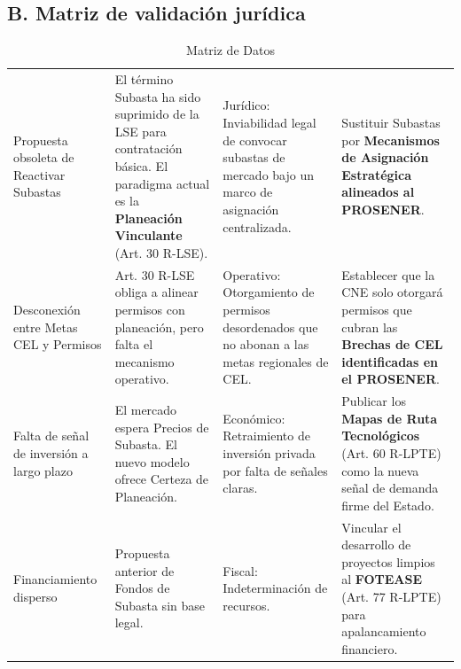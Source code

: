 \documentclass{cel}
\begin{document}
\subsection{B. Matriz de validación jurídica}
\nopagebreak

\vspace{0.3cm}
\begin{tabladoradoLargo}
\renewcommand{\tabularxcolumn}[1]{p{#1}}
\begin{xltabular}{\textwidth}{|X|X|X|X|}
\caption{Matriz de Datos} \\
\toprule
{}  &  &  &  \\
\midrule
\endhead
Propuesta obsoleta de \textquotedbl{}Reactivar Subastas\textquotedbl{} & El término \textquotedbl{}Subasta\textquotedbl{} ha sido suprimido de la LSE para contratación básica. El paradigma actual es la \textbf{Planeación Vinculante} (Art. 30 R-LSE). & Jurídico: Inviabilidad legal de convocar subastas de mercado bajo un marco de asignación centralizada. & Sustituir \textquotedbl{}Subastas\textquotedbl{} por \textbf{\textquotedbl{}Mecanismos de Asignación Estratégica alineados al PROSENER\textquotedbl{}}. \\ \hline
Desconexión entre Metas CEL y Permisos & Art. 30 R-LSE obliga a alinear permisos con planeación, pero falta el mecanismo operativo. & Operativo: Otorgamiento de permisos desordenados que no abonan a las metas regionales de CEL. & Establecer que la CNE solo otorgará permisos que cubran las \textbf{Brechas de CEL identificadas en el PROSENER}. \\ \hline
Falta de señal de inversión a largo plazo & El mercado espera \textquotedbl{}Precios de Subasta\textquotedbl{}. El nuevo modelo ofrece \textquotedbl{}Certeza de Planeación\textquotedbl{}. & Económico: Retraimiento de inversión privada por falta de señales claras. & Publicar los \textbf{Mapas de Ruta Tecnológicos} (Art. 60 R-LPTE) como la nueva señal de demanda firme del Estado. \\ \hline
Financiamiento disperso & Propuesta anterior de \textquotedbl{}Fondos de Subasta\textquotedbl{} sin base legal. & Fiscal: Indeterminación de recursos. & Vincular el desarrollo de proyectos limpios al \textbf{FOTEASE} (Art. 77 R-LPTE) para apalancamiento financiero. \\ \hline
\bottomrule
\end{xltabular}
\end{tabladoradoLargo}
\end{document}
